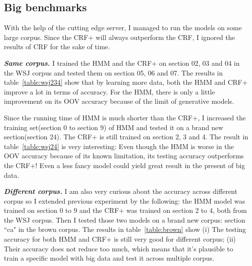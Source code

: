 \documentclass[10pt]{article}
\begin{document}
\subsection{Big benchmarks}
With the help of the cutting edge server, I managed to run the models on some large corpus. Since the CRF+ will always outperform the CRF, I ignored the results of CRF for the sake of time.

{\bf \emph{Same corpus.}} I trained the HMM and the CRF+ on section 02, 03 and 04 in the WSJ corpus and tested them on section 05, 06 and 07. The results in table~\ref{table:wsj234} show that  by learning more data, both the HMM and CRF+ improve a lot in terms of accuracy. For the HMM, there is only a little improvement on its OOV accuracy because of the limit of generative models. 

Since the running time of HMM is much shorter than the CRF+, I increased the training set(section 0 to section 9) of HMM and tested it on a brand new section(section 24). The CRF+ is still trained on section 2, 3 and 4. The result in table~\ref{table:wsj24} is very interesting: Even though the HMM is worse in the OOV accuracy because of its known limitation, its testing accuracy outperforms the CRF+! Even a less fancy model could yield great result in the present of big data.

{\bf \emph{Different corpus.}} I am also very curious about the accuracy across different corpus so I extended previous experiment by the following: the HMM model was trained on section 0 to 9 and the CRF+ was trained on section 2 to 4, both from the WSJ corpus. Then I tested those two models on a brand new corpus: section ``ca" in the brown corpus. The results in table~\ref{table:brown} show (i) The testing accuracy for both HMM and CRF+ is still very good for different corpus; (ii) Their accuracy does not reduce too much, which means that it's plausible to train a specific model with big data and test it across multiple corpus.
\end{document}
